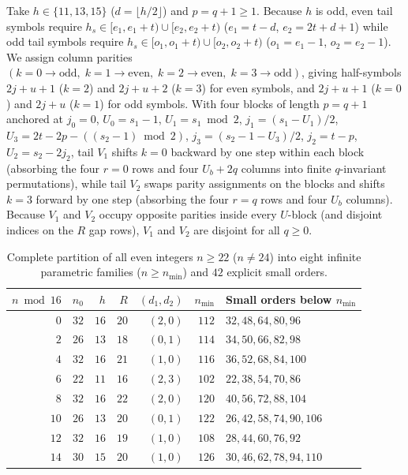 \documentclass[11pt]{article}
\begin{document}
Take $h \in \{11, 13, 15\}$ ($d = \lfloor h/2 \rfloor$) and $p = q + 1 \ge 1$. Because $h$ is odd, even tail symbols require $h_s \in [e_1, e_1 + t) \cup [e_2, e_2 + t)$ ($e_1 = t - d$, $e_2 = 2t + d + 1$) while odd tail symbols require $h_s \in [o_1, o_1 + t) \cup [o_2, o_2 + t)$ ($o_1 = e_1 - 1$, $o_2 = e_2 - 1$). We assign column parities $(k = 0 \to \text{odd},\; k = 1 \to \text{even},\; k = 2 \to \text{even},\; k = 3 \to \text{odd})$, giving half-symbols $2j + u + 1$ ($k = 2$) and $2j + u + 2$ ($k = 3$) for even symbols, and $2j + u + 1$ ($k = 0$) and $2j + u$ ($k = 1$) for odd symbols. With four blocks of length $p = q + 1$ anchored at $j_0 = 0$, $U_0 = s_1 - 1$, $U_1 = s_1 \bmod 2$, $j_1 = (s_1 - U_1)/2$, $U_3 = 2t - 2p - ((s_2 - 1) \bmod 2)$, $j_3 = (s_2 - 1 - U_3)/2$, $j_2 = t - p$, $U_2 = s_2 - 2j_2$, tail $V_1$ shifts $k = 0$ backward by one step within each block (absorbing the four $r = 0$ rows and four $U_b + 2q$ columns into finite $q$-invariant permutations), while tail $V_2$ swaps parity assignments on the blocks and shifts $k = 3$ forward by one step (absorbing the four $r = q$ rows and four $U_b$ columns). Because $V_1$ and $V_2$ occupy opposite parities inside every $U$-block (and disjoint indices on the $R$ gap rows), $V_1$ and $V_2$ are disjoint for all $q \ge 0$.

\begin{table}[ht]
\centering
\small
\begin{tabular}{@{}rrrrrrl@{}}
\toprule
$n \bmod 16$ & $n_0$ & $h$ & $R$ & $(d_1, d_2)$ & $n_{\min}$ & Small orders below $n_{\min}$ \\
\midrule
$0$ & $32$ & $16$ & $20$ & $(2, 0)$ & $112$ & $32, 48, 64, 80, 96$ \\
$2$ & $26$ & $13$ & $18$ & $(0, 1)$ & $114$ & $34, 50, 66, 82, 98$ \\
$4$ & $32$ & $16$ & $21$ & $(1, 0)$ & $116$ & $36, 52, 68, 84, 100$ \\
$6$ & $22$ & $11$ & $16$ & $(2, 3)$ & $102$ & $22, 38, 54, 70, 86$ \\
$8$ & $32$ & $16$ & $22$ & $(2, 0)$ & $120$ & $40, 56, 72, 88, 104$ \\
$10$ & $26$ & $13$ & $20$ & $(0, 1)$ & $122$ & $26, 42, 58, 74, 90, 106$ \\
$12$ & $32$ & $16$ & $19$ & $(1, 0)$ & $108$ & $28, 44, 60, 76, 92$ \\
$14$ & $30$ & $15$ & $20$ & $(1, 0)$ & $126$ & $30, 46, 62, 78, 94, 110$ \\
\bottomrule
\end{tabular}
\caption{Complete partition of all even integers $n \ge 22$ ($n \ne 24$) into eight infinite parametric families ($n \ge n_{\min}$) and $42$ explicit small orders.}
\label{tab:coverage}
\end{table}
\end{document}
